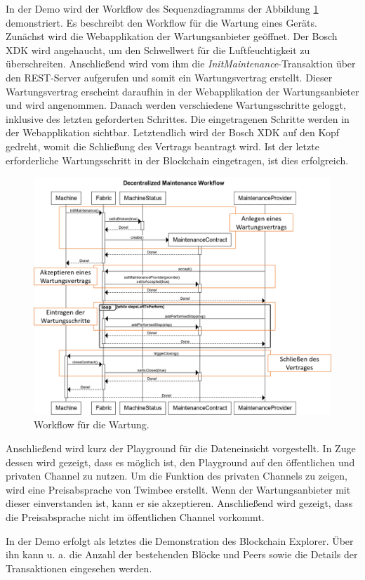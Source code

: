 In der Demo wird der Workflow des Sequenzdiagramms der Abbildung \ref{fig:maintenance-workflow} demonstriert. Es beschreibt den Workflow für die Wartung eines Geräts. Zunächst wird die Webapplikation der Wartungsanbieter geöffnet. Der Bosch XDK wird angehaucht, um den Schwellwert für die Luftfeuchtigkeit zu überschreiten. Anschließend wird vom ihm die \textit{InitMaintenance}-Transaktion über den REST-Server aufgerufen und somit ein Wartungsvertrag erstellt. Dieser Wartungsvertrag erscheint daraufhin in der Webapplikation der Wartungsanbieter und wird angenommen. Danach werden verschiedene Wartungsschritte geloggt, inklusive des letzten geforderten Schrittes. Die eingetragenen Schritte werden in der Webapplikation sichtbar. Letztendlich wird der Bosch XDK auf den Kopf gedreht, womit die Schließung des Vertrags beantragt wird. Ist der letzte erforderliche Wartungsschritt in der Blockchain eingetragen, ist dies erfolgreich.

\begin{figure}[!htbp]
    \centering
      \includegraphics[width=1.0\textwidth,angle=0]{images/maintenance-workflow-marked}
       \caption{Workflow für die Wartung.}
      \label{fig:maintenance-workflow}
\end{figure}

Anschließend wird kurz der Playground für die Dateneinsicht vorgestellt. In Zuge dessen wird gezeigt, dass es möglich ist, den Playground auf den öffentlichen und privaten Channel zu nutzen. Um die Funktion des privaten Channels zu zeigen, wird eine Preisabsprache von Twimbee erstellt. Wenn der Wartungsanbieter mit dieser einverstanden ist, kann er sie akzeptieren. Anschließend wird gezeigt, dass die Preisabsprache nicht im öffentlichen Channel vorkommt.

In der Demo erfolgt als letztes die Demonstration des Blockchain Explorer. Über ihn kann u. a. die Anzahl der bestehenden Blöcke und Peers sowie die Details der Transaktionen eingesehen werden.